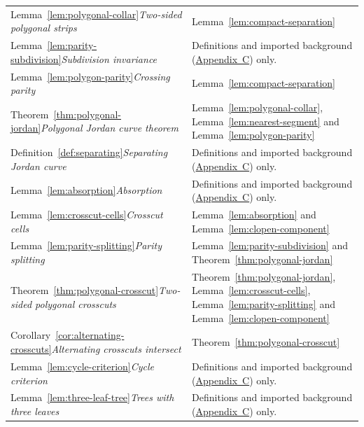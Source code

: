 \documentclass[11pt]{article}
\theoremstyle{mainplain}
\theoremstyle{mainroman}
\theoremstyle{definition}
\numberwithin{equation}{section}
\begin{document}
\begin{longtable}{@{}>{\raggedright\arraybackslash}p{}>{\raggedright\arraybackslash}p{}@{}}
Lemma~\ref{lem:polygonal-collar}\newline\emph{Two-sided polygonal strips} & Lemma~\ref{lem:compact-separation} \\
Lemma~\ref{lem:parity-subdivision}\newline\emph{Subdivision invariance} & Definitions and imported background (\hyperref[app:background]{Appendix~C}) only. \\
Lemma~\ref{lem:polygon-parity}\newline\emph{Crossing parity} & Lemma~\ref{lem:compact-separation} \\
Theorem~\ref{thm:polygonal-jordan}\newline\emph{Polygonal Jordan curve theorem} & Lemma~\ref{lem:polygonal-collar}, Lemma~\ref{lem:nearest-segment} and Lemma~\ref{lem:polygon-parity} \\
Definition~\ref{def:separating}\newline\emph{Separating Jordan curve} & Definitions and imported background (\hyperref[app:background]{Appendix~C}) only. \\
Lemma~\ref{lem:absorption}\newline\emph{Absorption} & Definitions and imported background (\hyperref[app:background]{Appendix~C}) only. \\
Lemma~\ref{lem:crosscut-cells}\newline\emph{Crosscut cells} & Lemma~\ref{lem:absorption} and Lemma~\ref{lem:clopen-component} \\
Lemma~\ref{lem:parity-splitting}\newline\emph{Parity splitting} & Lemma~\ref{lem:parity-subdivision} and Theorem~\ref{thm:polygonal-jordan} \\
Theorem~\ref{thm:polygonal-crosscut}\newline\emph{Two-sided polygonal crosscuts} & Theorem~\ref{thm:polygonal-jordan}, Lemma~\ref{lem:crosscut-cells}, Lemma~\ref{lem:parity-splitting} and Lemma~\ref{lem:clopen-component} \\
Corollary~\ref{cor:alternating-crosscuts}\newline\emph{Alternating crosscuts intersect} & Theorem~\ref{thm:polygonal-crosscut} \\
Lemma~\ref{lem:cycle-criterion}\newline\emph{Cycle criterion} & Definitions and imported background (\hyperref[app:background]{Appendix~C}) only. \\
Lemma~\ref{lem:three-leaf-tree}\newline\emph{Trees with three leaves} & Definitions and imported background (\hyperref[app:background]{Appendix~C}) only. \\

\end{longtable}
\end{document}
